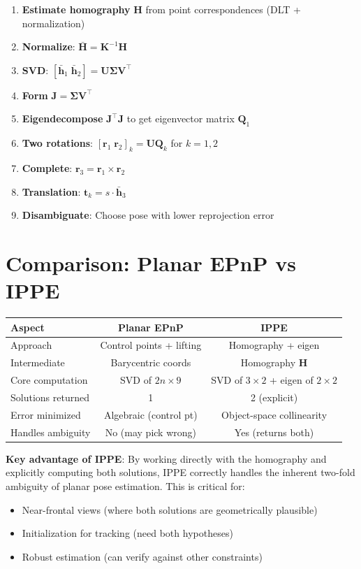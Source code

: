 \documentclass[11pt]{article}
\newcommand{\vect}[1]{\mathbf{#1}}
\newcommand{\mat}[1]{\mathbf{#1}}
\newcommand{\planar}[1]{\colorbox{yellow!30}{#1}}
\begin{document}
\begin{enumerate}
    \item \textbf{Estimate homography} $\mat{H}$ from point correspondences (DLT + normalization)
    \item \textbf{Normalize}: $\bar{\mat{H}} = \mat{K}^{-1}\mat{H}$
    \item \textbf{SVD}: $[\bar{\vect{h}}_1 \; \bar{\vect{h}}_2] = \mat{U}\mat{\Sigma}\mat{V}^\top$
    \item \textbf{Form} $\mat{J} = \mat{\Sigma}\mat{V}^\top$
    \item \textbf{Eigendecompose} $\mat{J}^\top\mat{J}$ to get eigenvector matrix $\mat{Q}_1$
    \item \textbf{Two rotations}: $[\vect{r}_1 \; \vect{r}_2]_k = \mat{U}\mat{Q}_k$ for $k = 1, 2$
    \item \textbf{Complete}: $\vect{r}_3 = \vect{r}_1 \times \vect{r}_2$
    \item \textbf{Translation}: $\vect{t}_k = s \cdot \bar{\vect{h}}_3$
    \item \textbf{Disambiguate}: Choose pose with lower reprojection error
\end{enumerate}

\section{Comparison: Planar EPnP vs IPPE}

\begin{center}
\begin{tabular}{|l|c|c|}
\hline
\textbf{Aspect} & \textbf{Planar EPnP} & \textbf{IPPE} \\
\hline
Approach & Control points + lifting & Homography + eigen \\
Intermediate & Barycentric coords & Homography $\mat{H}$ \\
Core computation & SVD of $2n \times 9$ & SVD of $3 \times 2$ + eigen of $2 \times 2$ \\
Solutions returned & 1 & \planar{2 (explicit)} \\
Error minimized & Algebraic (control pt) & Object-space collinearity \\
Handles ambiguity & No (may pick wrong) & \planar{Yes (returns both)} \\
\hline
\end{tabular}
\end{center}

\begin{planarbox}
\textbf{Key advantage of IPPE}: By working directly with the homography and explicitly computing both solutions, IPPE correctly handles the inherent two-fold ambiguity of planar pose estimation. This is critical for:
\begin{itemize}
    \item Near-frontal views (where both solutions are geometrically plausible)
    \item Initialization for tracking (need both hypotheses)
    \item Robust estimation (can verify against other constraints)
\end{itemize}
\end{planarbox}
\end{document}

